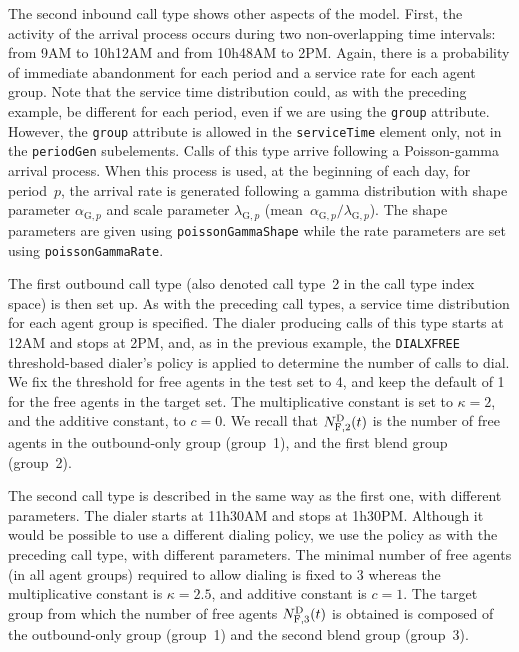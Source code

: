 The second inbound call type shows other aspects of the model.
First, the activity of the arrival process occurs during two
non-overlapping time intervals: from 9AM to 10h12AM and
from 10h48AM to 2PM.
Again, there is a probability of immediate abandonment for each period
and a service rate for each agent group.
Note that the service time distribution could, as with the preceding
example, be different for each period, even if we are using the
\texttt{group} attribute.  However, the \texttt{group} attribute
is allowed in the \texttt{service\-Time} element only, not in
the \texttt{period\-Gen} subelements.
Calls of this type arrive following a Poisson-gamma arrival process.
When this process is used, at the beginning of each day,
for period~$p$, the arrival rate is generated following a gamma distribution
with shape parameter $\alpha_{\mathrm{G}, p}$ and scale parameter
$\lambda_{\mathrm{G}, p}$ (mean~$\alpha_{\mathrm{G},
  p}/\lambda_{\mathrm{G}, p}$).
The shape parameters are given using
\texttt{poisson\-Gamma\-Shape} while the rate parameters
are set using \texttt{poisson\-Gamma\-Rate}.

The first outbound call type (also denoted call type~2 in the call type
index space) is then set up.
As with the preceding call types, a service time
distribution for each agent group is specified.
The dialer producing calls of this type starts at 12AM and stops at
2PM, and, as in the previous example,
the \texttt{DIALXFREE} threshold-based dialer's policy
is applied to
determine the number of calls to dial.
We fix the threshold for free agents in the test set to 4,
and keep the default of 1 for the free agents in the target set.
The multiplicative constant is set
to $\kappa=2$, and the additive constant, to $c=0$.
We recall that $\Ndf[2](t)$ is the number of
free agents in the outbound-only group (group~1),
and the first blend group (group~2).

The second call type is described in the same way as the first one, with
different parameters.
The dialer starts at 11h30AM and stops at 1h30PM.
Although it would be possible to use a different dialing policy,
we use the policy as with the preceding call type, with
different parameters.
The minimal number of free agents (in all agent groups) required to
allow dialing is
fixed to 3 whereas the multiplicative constant is $\kappa=2.5$, and additive
constant is $c=1$.
The target group from which the number of free agents $\Ndf[3](t)$ is
obtained is composed of the outbound-only group (group~1) and the
second blend group (group~3).

